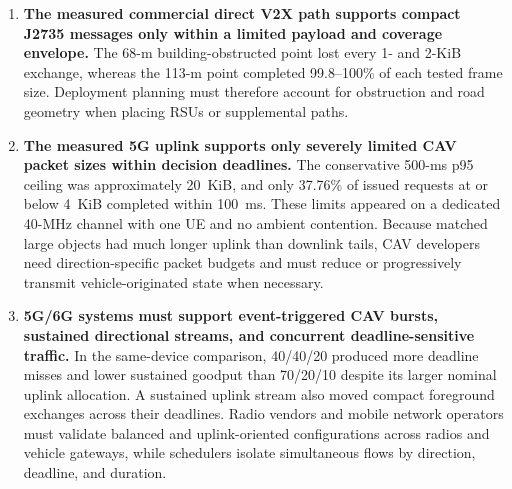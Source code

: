 \begin{enumerate}
  \renewcommand{\labelenumi}{\arabic{enumi})}
  \item \textbf{The measured commercial direct V2X path supports compact J2735
  messages only within a limited payload and coverage envelope.} The 68-m
  building-obstructed point lost every 1- and 2-KiB exchange, whereas the 113-m
  point completed 99.8--100\% of each tested frame size. Deployment planning
  must therefore account for obstruction and road geometry when placing RSUs
  or supplemental paths.

  \item \textbf{The measured 5G uplink supports only severely limited CAV
  packet sizes within decision deadlines.} The conservative
  500-ms p95 ceiling was approximately 20~KiB, and only 37.76\% of issued
  requests at or below 4~KiB completed within 100~ms. These limits appeared on
  a dedicated 40-MHz channel with one UE and no ambient contention. Because
  matched large objects had much longer uplink than downlink tails, CAV
  developers need direction-specific packet budgets and must reduce or
  progressively transmit vehicle-originated state when necessary.

  \item \textbf{5G/6G systems must support event-triggered CAV bursts,
  sustained directional streams, and concurrent deadline-sensitive traffic.}
  In the same-device comparison, 40/40/20 produced more deadline misses and
  lower sustained goodput than 70/20/10 despite its larger nominal uplink
  allocation. A sustained uplink stream also moved compact foreground
  exchanges across their deadlines. Radio vendors and mobile network operators
  must validate balanced and uplink-oriented configurations across radios and
  vehicle gateways, while schedulers isolate simultaneous flows by direction,
  deadline, and duration.
\end{enumerate}
